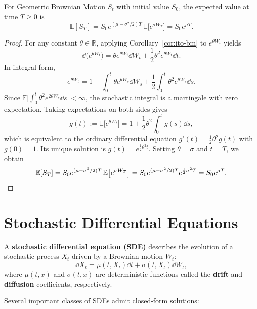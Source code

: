 \begin{proposition}
\label{prop:gbm-mean}
For Geometric Brownian Motion $S_t$ with initial value $S_0$, the expected value at time $T \ge 0$ is
\[
\mathbb{E}[S_T] = S_0 e^{(\mu - \sigma^2 / 2)T}\,\mathbb{E}\big[e^{\sigma W_T}\big] = S_0 e^{\mu T}.
\]
\end{proposition}
\begin{proof}
For any constant $\theta \in \mathbb{R}$, applying Corollary~\ref{cor:ito-bm} to $e^{\theta W_t}$ yields
\[
\dd\big(e^{\theta W_t}\big) = \theta e^{\theta W_t}\dd W_t + \frac{1}{2}\theta^2 e^{\theta W_t}\dd t.
\]
In integral form,
\[
e^{\theta W_t} = 1 + \int_0^t \theta e^{\theta W_s}\dd W_s + \frac{1}{2}\int_0^t \theta^2 e^{\theta W_s}\dd s.
\]
Since $\mathbb{E}\big[\int_0^t \theta^2 e^{2\theta W_s}\dd s\big] < \infty$, the stochastic integral is a martingale with zero expectation. Taking expectations on both sides gives
\[
g(t) := \mathbb{E}\big[e^{\theta W_t}\big] = 1 + \frac{1}{2}\theta^2 \int_0^t g(s)\dd s,
\]
which is equivalent to the ordinary differential equation $g'(t) = \frac{1}{2}\theta^2 g(t)$ with $g(0) = 1$. Its unique solution is $g(t) = e^{\frac{1}{2}\theta^2 t}$. Setting $\theta = \sigma$ and $t = T$, we obtain
\[
\mathbb{E}[S_T] = S_0 e^{(\mu - \sigma^2 / 2)T}\,\mathbb{E}\big[e^{\sigma W_T}\big] = S_0 e^{(\mu - \sigma^2 / 2)T} e^{\frac{1}{2}\sigma^2 T} = S_0 e^{\mu T}. \qedhere
\]
\end{proof}

\section{Stochastic Differential Equations}

\begin{definition}
\label{def:sde}
A \textbf{stochastic differential equation (SDE)} describes the evolution of a stochastic process $X_t$ driven by a Brownian motion $W_t$:
\[
\dd X_t = \mu(t, X_t)\dd t + \sigma(t, X_t)\dd W_t,
\]
where $\mu(t, x)$ and $\sigma(t, x)$ are deterministic functions called the \textbf{drift} and \textbf{diffusion} coefficients, respectively.
\end{definition}

Several important classes of SDEs admit closed-form solutions:

